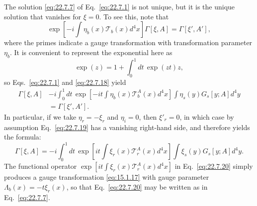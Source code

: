 The solution \eqref{eq:22.7.7} of Eq.~\eqref{eq:22.7.1} is not unique,
but it is the unique solution that vanishes for $\xi=0$. To see this,
note that
\begin{equation}
 \exp\left[-i\int\eta_b(x)\mathcal T_b(x)d^4x\right]
 \Gamma[\xi,A]
 =\Gamma[\xi',A'],
 \tag{22.7.18}\label{eq:22.7.18}
\end{equation}
where the primes indicate a gauge transformation with transformation
parameter $\eta_b$. It is convenient to represent the exponential
here as
\[
 \exp(z)=1+\int_0^1dt\,\exp(zt)z,
\]
so Eqs.~\eqref{eq:22.7.1} and \eqref{eq:22.7.18} yield
\begin{equation}
 \begin{aligned}
 \Gamma[\xi,A]
 &-i\int_0^1dt\,
 \exp\left[-it\int\eta_b(x)\mathcal T_b^A(x)d^4x\right]
 \int\eta_s(y)G_s[y;A]d^4y
 \\
 &=\Gamma[\xi',A'].
 \end{aligned}
 \tag{22.7.19}\label{eq:22.7.19}
\end{equation}
In particular, if we take $\eta_r=-\xi_r$ and $\eta_i=0$, then
$\xi'_r=0$, in which case by assumption Eq.~\eqref{eq:22.7.19} has a
vanishing right-hand side, and therefore yields the formula:
\begin{equation}
 \Gamma[\xi,A]
 =-i\int_0^1dt\,
 \exp\left[it\int\xi_r(x)\mathcal T_r^A(x)d^4x\right]
 \int\xi_s(y)G_s[y;A]d^4y.
 \tag{22.7.20}\label{eq:22.7.20}
\end{equation}
The functional operator
$\exp[it\int\xi_r(x)\mathcal T_r^A(x)d^4x]$ in
Eq.~\eqref{eq:22.7.20} simply produces a gauge transformation
\eqref{eq:15.1.17} with gauge parameter
$\Lambda_b(x)=-t\xi_r(x)$, so that Eq.~\eqref{eq:22.7.20} may be
written as in Eq.~\eqref{eq:22.7.7}.

